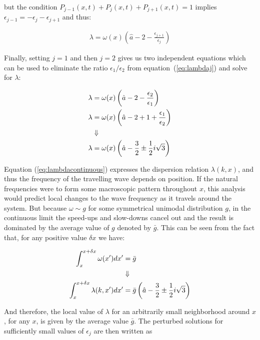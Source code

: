 \noindent but the condition $P_{j-1}(x,t)+P_j(x,t)+P_{j+1}(x,t)=1$ implies $\epsilon_{j-1}=-\epsilon_j-\epsilon_{j+1}$ and thus:

\begin{align}
    \lambda = \omega(x)\left( \hat{a}-2 - \frac{\epsilon_{j+1}}{\epsilon_j} \right)
    \label{eq:lambdaj}
\end{align}

Finally, setting $j=1$ and then $j=2$ gives us two independent equations which can be used to eliminate the ratio
$\epsilon_1/\epsilon_2$ from equation~(\ref{eq:lambdaj}) and solve for $\lambda$:

\begin{align}
    \lambda &= \omega(x)\left( \hat{a} - 2 - \frac{\epsilon_2}{\epsilon_1} \right) \notag \\
    \lambda &= \omega(x)\left( \hat{a} - 2 + 1 + \frac{\epsilon_1}{\epsilon_2} \right) \notag \\
    &\Downarrow \notag \\
    \lambda &= \omega(x)\left( \hat{a} - \frac{3}{2} \pm \frac{1}{2}i\sqrt{3} \right)
    \label{eq:lambdacontinuous}
\end{align}

Equation (\ref{eq:lambdacontinuous}) expresses the dispersion relation $\lambda(k,x)$, and thus the frequency of the travelling wave
depends on position. If the natural frequencies were to form some macroscopic pattern throughout $x$, this analysis would predict local
changes to the wave frequency as it travels around the system. But because $\omega \sim g$ for some symmetrical unimodal distribution
$g$, in the continuous limit the speed-ups and slow-downs cancel out and the result is dominated by the average value of $g$ denoted by
$\bar{g}$. This can be seen from the fact that, for any positive value $\delta x$ we have:

\begin{align}
    \int_x^{x+\delta x} \omega(x')dx' &= \bar{g} \notag\\
    & \Downarrow \notag\\
    \int_x^{x+\delta x} \lambda(k,x')dx' &= \bar{g} \left( \hat{a} - \frac{3}{2} \pm \frac{1}{2}i\sqrt{3} \right)
\end{align}

And therefore, the local value of $\lambda$ for an arbitrarily small neighborhood around $x$, for any $x$, is given by the average
value $\bar{g}$. The perturbed solutions for sufficiently small values of $\epsilon_j$ are then written as

